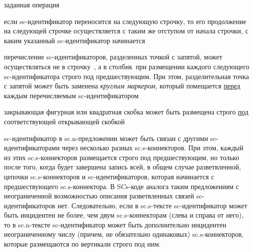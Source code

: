\begin{SCn}
\begin{scnstruct}
\begin{scnrelfromlist}{заданная операция}
{{\begin{scnitemize}
                    \item{если sc-идентификатор переносится на следующую строчку, то его продолжение на следующей строчке осуществляется с таким же отступом от начала строчки, с каким указанный sc-идентификатор начинается}
                    \item{перечисление sc-идентификаторов, разделенных точкой с запятой, может осуществляться не в строчку\ , а в столбик\ при размещении каждого следующего sc-идентификатора строго под предшествующим. При этом, разделительная точка с запятой может быть заменена \textit{круглым маркером}, который помещается \uline{перед} каждым перечисляемым \mbox{sc-идентификатором}}
                    \item{закрывающая фигурная или квадратная скобка может быть размещена строго \uline{под} соответствующей открывающей скобкой}
                    \item{sc-идентификатор в sc.n-предложении может быть связан с другими sc-идентификаторами через несколько разных sc.s-коннекторов. При этом, каждый из этих sc.s-коннекторов размещается строго под предшествующим, но только после того, когда будет завершена запись всей, в общем случае разветвленной, цепочки sc.s-коннекторов и sc-идентификаторов, которая начинается с предшествующего sc.s-коннектора. В SCs-коде аналога таким предложениям с неограниченной возможностью описания разветвленных связей sc-идентификаторов нет. Следовательно, если в sc.s-тексте sc-идентификатор может быть инцидентен не более, чем двум sc.s-коннекторам (слева и справа от него), то в sc.n-тексте sc-идентификатор может быть дополнительно инцидентен неограниченному числу (причем, не обязательно одинаковых) sc.s-коннекторов, которые размещаются по вертикали строго под ним.}
                \end{scnitemize}
            }}
\end{scnrelfromlist}
\end{scnstruct}
\end{SCn}
